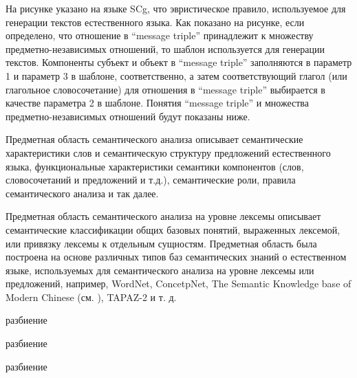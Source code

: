 На рисунке \textit{} указано на языке SCg, что эвристическое правило, используемое для генерации текстов естественного языка. Как показано на рисунке, если определено, что отношение в ``message triple'' принадлежит к множеству предметно-независимых отношений, то шаблон используется для генерации текстов. Компоненты субъект и объект в ``message triple'' заполняются в параметр 1 и параметр 3 в шаблоне, соответственно, а затем соответствующий глагол (или глагольное словосочетание) для отношения в ``message triple'' выбирается в качестве параметра 2 в шаблоне. Понятия ``message triple'' и множества предметно-независимых отношений будут показаны ниже.

Предметная область семантического анализа описывает семантические характеристики слов и семантическую структуру предложений естественного языка, функциональные характеристики семантики компонентов (слов, словосочетаний и предложений и т.д.), семантические роли, правила семантического анализа и так далее.

Предметная область семантического анализа на уровне лексемы описывает семантические классификации общих базовых понятий, выраженных лексемой, или привязку лексемы к отдельным сущностям. Предметная область была построена на основе различных типов баз семантических знаний о естественном языке, используемых для семантического анализа на уровне лексемы или предложений, например, WordNet, ConcetpNet, The Semantic Knowledge base of Modern Chinese (см. ), TAPAZ-2 и т. д.

\begin{SCn}
\end{SCn}


\begin{SCn}
	\begin{scnrelfromset}{разбиение}
		\begin{scnindent}
			\begin{scnrelfromset}{разбиение}
			\end{scnrelfromset}
		\end{scnindent}
		\scnitem {объект*}
		\begin{scnindent}
			\begin{scnrelfromset}{разбиение}
				\scnitem {покрытие*}
				\scnitem {корпус*}
				\scnitem {прослойка*}
				\scnitem {сердцевина*}
			\end{scnrelfromset}
		\end{scnindent}
	\end{scnrelfromset}
\end{SCn}

